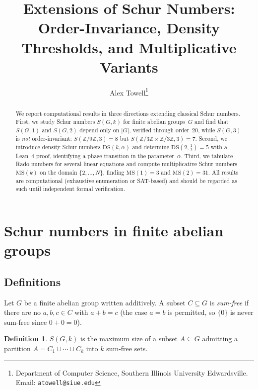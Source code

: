 \documentclass[11pt]{article}
\theoremstyle{plain}
\theoremstyle{definition}
\newtheorem{definition}[theorem]{Definition}
\newcommand{\ZZ}{\mathbb{Z}}
\newcommand{\DS}{\mathrm{DS}}
\newcommand{\MS}{\mathrm{MS}}
\begin{document}
\title{Extensions of Schur Numbers:\\
Order-Invariance, Density Thresholds, and Multiplicative Variants}

\author{Alex Towell\thanks{Department of Computer Science,
Southern Illinois University Edwardsville.
Email: \texttt{atowell@siue.edu}}}

\date{}
\maketitle

\begin{abstract}
We report computational results in three directions extending
classical Schur numbers.
First, we study Schur numbers $S(G,k)$ for finite abelian groups~$G$
and find that $S(G,1)$ and $S(G,2)$ depend only on $|G|$, verified
through order~20, while $S(G,3)$ is \emph{not} order-invariant:
$S(\ZZ/9\ZZ,3)=8$ but $S(\ZZ/3\ZZ\times\ZZ/3\ZZ,3)=7$.
Second, we introduce density Schur numbers $\DS(k,\alpha)$ and
determine $\DS(2,\tfrac{1}{2})=5$ with a Lean~4 proof,
identifying a phase transition in the parameter~$\alpha$.
Third, we tabulate Rado numbers for several linear equations and
compute multiplicative Schur numbers $\MS(k)$ on the domain
$\{2,\ldots,N\}$, finding $\MS(1)=3$ and $\MS(2)=31$.
All results are computational (exhaustive enumeration or SAT-based)
and should be regarded as such until independent formal verification.
\end{abstract}

\section{Schur numbers in finite abelian groups}\label{sec:groups}

\subsection{Definitions}

Let $G$ be a finite abelian group written additively.
A subset $C\subseteq G$ is \emph{sum-free} if there are no
$a,b,c\in C$ with $a+b=c$ (the case $a=b$ is permitted, so
$\{0\}$ is never sum-free since $0+0=0$).

\begin{definition}
$S(G,k)$ is the maximum size of a subset $A\subseteq G$ admitting a
partition $A=C_1\sqcup\cdots\sqcup C_k$ into $k$ sum-free sets.
\end{definition}
\end{document}
